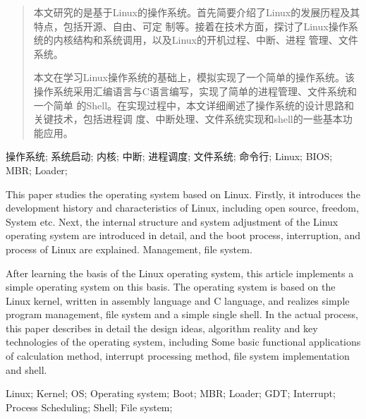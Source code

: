 \documentclass{swfuthesis}
\begin{document}
\maketitle
\frontmatter

\begin{abstract} %
  本文研究的是基于Linux的操作系统。首先简要介绍了Linux的发展历程及其特点，包括开源、自由、可定
  制等。接着在技术方面，探讨了Linux操作系统的内核结构和系统调用，以及Linux的开机过程、中断、进程
  管理、文件系统。

  本文在学习Linux操作系统的基础上，模拟实现了一个简单的操作系统。该
  操作系统采用汇编语言与C语言编写，实现了简单的进程管理、文件系统和一个简单
  的Shell。在实现过程中，本文详细阐述了操作系统的设计思路和关键技术，包括进程调
  度、中断处理、文件系统实现和shell的一些基本功能应用。
\end{abstract}

\begin{keyword} %
操作系统; 系统启动; 内核; 中断; 进程调度; 文件系统; 命令行; Linux;
BIOS; MBR; Loader;
\end{keyword}

\begin{EAbstract}
  This paper studies the operating system based on Linux. Firstly, it
  introduces the development history and characteristics of Linux,
  including open source, freedom, System etc. Next, the internal
  structure and system adjustment of the Linux operating system are
  introduced in detail, and the boot process, interruption, and
  process of Linux are explained.  Management, file system.

  After learning the basis of the Linux operating system, this article
  implements a simple operating system on this basis.  The operating
  system is based on the Linux kernel, written in assembly language
  and C language, and realizes simple program management, file system
  and a simple single shell. In the actual process, this paper
  describes in detail the design ideas, algorithm reality and key
  technologies of the operating system, including Some basic
  functional applications of calculation method, interrupt processing
  method, file system implementation and shell.
\end{EAbstract}
\begin{EKeyword}
Linux; Kernel; OS; Operating system; Boot; MBR; Loader; GDT;
Interrupt; Process Scheduling; Shell; File system;
\end{EKeyword}

\tableofcontents     %
\cleardoublepage %
\end{document}
